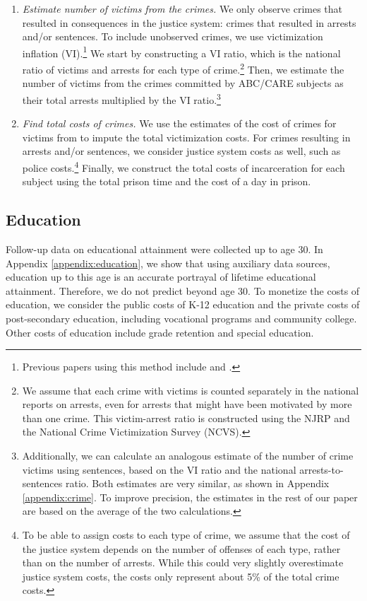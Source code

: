 \begin{enumerate}
\item \textit{Estimate number of victims from the crimes.} We only observe crimes that resulted in consequences in the justice system: crimes that resulted in arrests and/or sentences. To include unobserved crimes, we use victimization inflation (VI).\footnote{Previous papers using this method include \citet{Belfield_Nores_etal_2006_JHR} and \cite{Heckman_Moon_etal_2010_RateofReturn}.} We start by constructing a VI ratio, which is the national ratio of victims and arrests for each type of crime.\footnote{We assume that each crime with victims is counted separately in the national reports on arrests, even for arrests that might have been motivated by more than one crime. This victim-arrest ratio is constructed using the NJRP and the National Crime Victimization Survey (NCVS).} Then, we estimate the number of victims from the crimes committed by ABC/CARE subjects as their total arrests multiplied by the VI ratio.\footnote{Additionally, we can calculate an analogous estimate of the number of crime victims using sentences, based on the VI ratio and the national arrests-to-sentences ratio. Both estimates are very similar, as shown in Appendix \ref{appendix:crime}. To improve precision, the estimates in the rest of our paper are based on the average of the two calculations.}

\item \textit{Find total costs of crimes.} We use the estimates of the cost of crimes for victims from \cite{McCollister_etal_2010_DAD} to impute the total victimization costs. For crimes resulting in arrests and/or sentences, we consider justice system costs as well, such as police costs.\footnote{To be able to assign costs to each type of crime, we assume that the cost of the justice system depends on the number of offenses of each type, rather than on the number of arrests. While this could very slightly overestimate justice system costs, the costs only represent about 5\% of the total crime costs.} Finally, we construct the total costs of incarceration for each subject using the total prison time and the cost of a day in prison.
\end{enumerate}

\subsection{Education}

Follow-up data on educational attainment were collected up to age 30. In Appendix \ref{appendix:education}, we show that using auxiliary data sources, education up to this age is an accurate portrayal of lifetime educational attainment. Therefore, we do not predict beyond age 30. To monetize the costs of education, we consider the public costs of K-12 education and the private costs of post-secondary education, including vocational programs and community college. Other costs of education include grade retention and special education.

